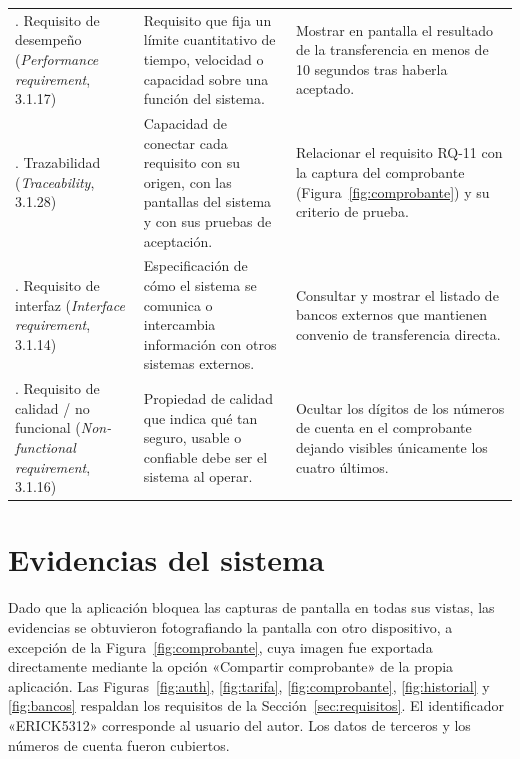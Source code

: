 \documentclass[11pt,a4paper]{article}
\begin{document}
{\begin{longtable}{>{\raggedright\arraybackslash}p{3cm}
                  >{\raggedright\arraybackslash}p{6.4cm}
                  >{\raggedright\arraybackslash}p{6.4cm}}
7. Requisito de desempeño (\textit{Performance requirement}, 3.1.17) & Requisito que fija un límite cuantitativo de tiempo, velocidad o capacidad sobre una función del sistema. & Mostrar en pantalla el resultado de la transferencia en menos de 10 segundos tras haberla aceptado.\\
8. Trazabilidad (\textit{Traceability}, 3.1.28) & Capacidad de conectar cada requisito con su origen, con las pantallas del sistema y con sus pruebas de aceptación. & Relacionar el requisito RQ-11 con la captura del comprobante (Figura~\ref{fig:comprobante}) y su criterio de prueba.\\
9. Requisito de interfaz (\textit{Interface requirement}, 3.1.14) & Especificación de cómo el sistema se comunica o intercambia información con otros sistemas externos. & Consultar y mostrar el listado de bancos externos que mantienen convenio de transferencia directa.\\
10. Requisito de calidad / no funcional (\textit{Non-functional requirement}, 3.1.16) & Propiedad de calidad que indica qué tan seguro, usable o confiable debe ser el sistema al operar. & Ocultar los dígitos de los números de cuenta en el comprobante dejando visibles únicamente los cuatro últimos.\\
\bottomrule
\end{longtable}
}

\section{Evidencias del sistema}
\label{sec:evidencias}
Dado que la aplicación bloquea las capturas de pantalla en todas sus vistas, las evidencias se obtuvieron fotografiando la pantalla con otro dispositivo, a excepción de la Figura~\ref{fig:comprobante}, cuya imagen fue exportada directamente mediante la opción «Compartir comprobante» de la propia aplicación. Las Figuras~\ref{fig:auth}, \ref{fig:tarifa}, \ref{fig:comprobante}, \ref{fig:historial} y \ref{fig:bancos} respaldan los requisitos de la Sección~\ref{sec:requisitos}. El identificador «ERICK5312» corresponde al usuario del autor. Los datos de terceros y los números de cuenta fueron cubiertos.
\end{document}
